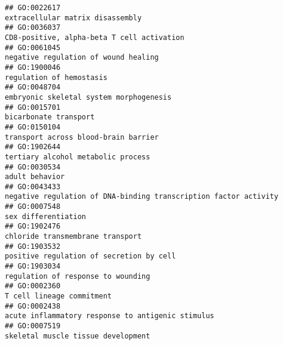 \documentclass[
]{article}
\begin{document}
\begin{verbatim}
## GO:0022617                                                                                                                 extracellular matrix disassembly
## GO:0036037                                                                                                       CD8-positive, alpha-beta T cell activation
## GO:0061045                                                                                                             negative regulation of wound healing
## GO:1900046                                                                                                                         regulation of hemostasis
## GO:0048704                                                                                                          embryonic skeletal system morphogenesis
## GO:0015701                                                                                                                            bicarbonate transport
## GO:0150104                                                                                                             transport across blood-brain barrier
## GO:1902644                                                                                                               tertiary alcohol metabolic process
## GO:0030534                                                                                                                                   adult behavior
## GO:0043433                                                                                 negative regulation of DNA-binding transcription factor activity
## GO:0007548                                                                                                                              sex differentiation
## GO:1902476                                                                                                                 chloride transmembrane transport
## GO:1903532                                                                                                         positive regulation of secretion by cell
## GO:1903034                                                                                                               regulation of response to wounding
## GO:0002360                                                                                                                        T cell lineage commitment
## GO:0002438                                                                                                acute inflammatory response to antigenic stimulus
## GO:0007519                                                                                                               skeletal muscle tissue development

\end{verbatim}
\end{document}
